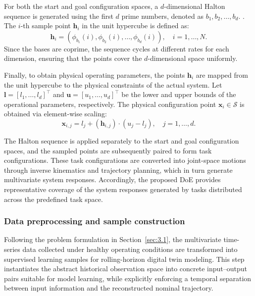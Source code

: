 \documentclass[a4paper,10pt]{cas-sc}%
\newcommand{\roundtworev}[1]{\textcolor{roundtwored}{#1}}
\begin{document}
For both the start and goal configuration spaces, a $d$-dimensional Halton sequence is generated using the first $d$ prime numbers, denoted as
$b_1,b_2,\ldots,b_d$. \citep{chi2005optimal}. The $i$-th sample point $\mathbf{h}_i$ in the unit hypercube is defined as:
\begin{equation}
	\mathbf{h}_i = \left( \phi_{b_1}(i), \phi_{b_2}(i), \dots, \phi_{b_d}(i) \right), \quad i = 1, \dots, N.
\end{equation}
Since the bases are coprime, the sequence cycles at different rates for each dimension, ensuring that the points cover the $d$-dimensional space uniformly.

Finally, to obtain physical operating parameters, the points $\mathbf{h}_i$ are mapped from the unit hypercube to the physical constraints of the actual system. Let $\mathbf{l} = [l_1, \dots, l_d]^\top$ and $\mathbf{u} = [u_1, \dots, u_d]^\top$ be the lower and upper bounds of the operational parameters, respectively. The physical configuration point $\mathbf{x}_i \in \mathcal{S}$ is obtained via element-wise scaling:
\begin{equation}
	\mathbf{x}_{i,j} = l_j + (\mathbf{h}_{i,j}) \cdot (u_j - l_j), \quad j = 1, \dots, d.
\end{equation}

\roundtworev{The Halton sequence is applied separately to the start and goal configuration spaces, and the sampled points are subsequently paired to form task configurations. These task configurations are converted into joint-space motions through inverse kinematics and trajectory planning, which in turn generate multivariate system responses. Accordingly, the proposed DoE provides representative coverage of the system responses generated by tasks distributed across the predefined task space.}

\subsubsection{Data preprocessing and sample construction}\label{sec3.2.2}

Following the problem formulation in Section~\ref{sec:3.1}, the multivariate time-series data collected under healthy operating conditions are transformed into supervised learning samples for rolling-horizon digital twin modeling. This step instantiates the abstract historical observation space into concrete input--output pairs suitable for model learning, while explicitly enforcing a temporal separation between input information and the reconstructed nominal trajectory.
\end{document}
